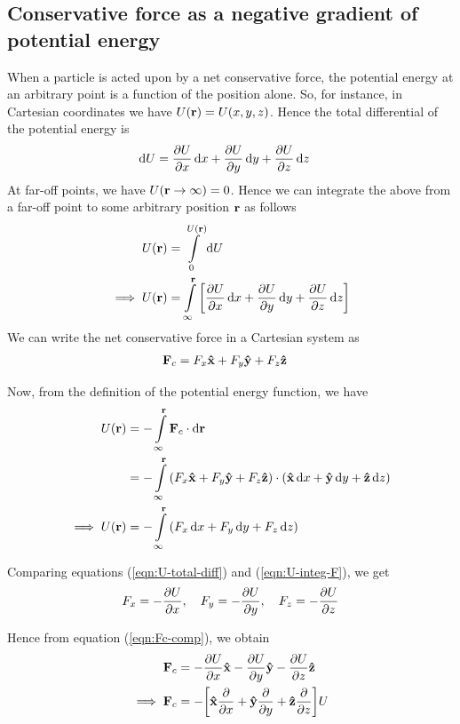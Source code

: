 	\setcounter{equation}{0}
	\subsection{Conservative force as a negative gradient of potential energy}
		When a particle is acted upon by a net conservative force, the potential energy at an arbitrary point is a function of the position alone. So, for instance, in Cartesian coordinates we have $U(\vb{r})=U(x,y,z)$. Hence the total differential of the potential energy is
		\begin{align*}
			\dd{U}&=\pdv{U}{x}\dd{x} + \pdv{U}{y}\dd{y} + \pdv{U}{z}\dd{z}
		\end{align*}
		At far-off points, we have $U(\vb{r}\to\infty)=0$. Hence we can integrate the above from a far-off point to some arbitrary position $\vb{r}$ as follows
		\begin{align}
			U(\vb{r})&=\int\limits_{0}^{U(\vb{r})}{\dd{U}} \nonumber\\
			\implies U(\vb{r})&=\int\limits_{\infty}^{\vb{r}}{\qty[\pdv{U}{x}\dd{x} + \pdv{U}{y}\dd{y} + \pdv{U}{z}\dd{z}]} \label{eqn:U-total-diff}
		\end{align}
		We can write the net conservative force in a Cartesian system as
		\begin{align}
			\vb{F}_c&=F_x\vu{x}+F_y\vu{y}+F_z\vu{z} \label{eqn:Fc-comp}
		\end{align}
		
		Now, from the definition of the potential energy function, we have
		\begin{align}
			U(\vb{r})&=-\int\limits_{\infty}^{\vb{r}}{\vb{F}_c\cdot\dd{\vb{r}}} \nonumber\\
				&=-\int\limits_{\infty}^{\vb{r}}{\qty(F_x\vu{x}+F_y\vu{y}+F_z\vu{z})\cdot\qty(\vu{x}\dd{x}+\vu{y}\dd{y}+\vu{z}\dd{z})} \nonumber\\
			\implies U(\vb{r})&=-\int\limits_{\infty}^{\vb{r}}{\qty(F_x\dd{x}+F_y\dd{y}+F_z\dd{z})} \label{eqn:U-integ-F}
		\end{align}
		
		Comparing equations (\ref{eqn:U-total-diff}) and (\ref{eqn:U-integ-F}), we get
		\begin{align*}
			F_x=-\pdv{U}{x},\quad F_y=-\pdv{U}{y},\quad F_z=-\pdv{U}{z}
		\end{align*}
		
		Hence from equation (\ref{eqn:Fc-comp}), we obtain
		\begin{align}
			\vb{F}_c&=-\pdv{U}{x}\vu{x}-\pdv{U}{y}\vu{y}-\pdv{U}{z}\vu{z} \nonumber\\
			\implies\vb{F}_c&=-\qty[\vu{x}\pdv{x}+\vu{y}\pdv{y}+\vu{z}\pdv{z}]U \label{eqn:F-del-U-01}
		\end{align}
		
